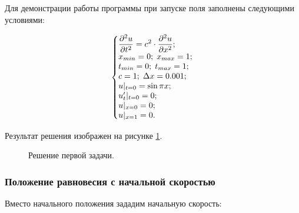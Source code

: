 \documentclass[12pt,a4paper,russian]{report}
\begin{document}
	Для демонстрации работы программы при запуске поля заполнены следующими условиями:
	
	\begin{equation*}
		\left\{\begin{array}{@{}l@{}}
			\displaystyle \frac{\partial^2u}{\partial t^2} = c^2 \cdot \frac{\partial^2u}{\partial x^2}; \\
			x_{min} = 0; \; x_{max} = 1; \\
			 t_{min} = 0; \; t_{max} = 1; \\
			 c = 1; \;  \Delta x = 0.001; \\
			u|_{t=0} = \sin \pi x; \\
			u'_{t}|_{t=0} = 0; \\
			u|_{x=0} = 0; \\
			u|_{x=1} = 0.
		\end{array}\right.\,
	\end{equation*}
	
	Результат решения изображен на рисунке \ref{img:first_task}.
	
	\begin{figure}[h]
		\caption{Решение первой задачи.}
		\label{img:first_task}
	\end{figure}
	
	\newpage
	\subsubsection{Положение равновесия с начальной скоростью}
	
	Вместо начального положения зададим начальную скорость:
	
\end{document}
